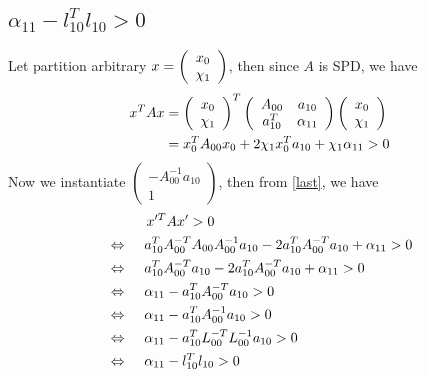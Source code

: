 \documentclass[11pt,a4paper]{article}
\begin{document}
\subsection{$\alpha_{11} - l_{10}^T l_{10} > 0$}
Let partition arbitrary $x = \left( \begin{array}{c} x_{0} \\ \chi_{1} \end{array} \right)$, then since $A$ is SPD, we have
\begin{align}
    x^T A x  \nonumber 
    &= \left( \begin{array}{c} x_{0} \\ \chi_{1} \end{array} \right)^T \left( \begin{array}{cc} A_{00} & a_{10} \\ a_{10}^T & \alpha_{11} \end{array} \right) \left( \begin{array}{c} x_{0} \\ \chi_{1} \end{array} \right) \nonumber \\
    &= x_{0}^T A_{00} x_{0} + 2 \chi_{1} x_{0}^T a_{10} + \chi_{1} \label{last}
    \alpha_{11} > 0
\end{align}
Now we instantiate $\left( \begin{array}{c}
             -A_{00}^{-1} a_{10}  \\ 1 
        \end{array} \right) $, then from \eqref{last}, we have
\begin{equation}
\begin{aligned}
    & \hspace{1cm} x'^T A x' > 0 \\
    &\Leftrightarrow\hspace{0.4cm} a_{10}^T A_{00}^{-T} A_{00} A_{00}^{-1} a_{10} - 2 a_{10}^T A_{00}^{-T}
    a_{10} + \alpha_{11} > 0 \\
    &\Leftrightarrow\hspace{0.4cm} a_{10}^T A_{00}^{-T} a_{10} - 2 a_{10}^T
    A_{00}^{-T} a_{10} + \alpha_{11} > 0\\
    &\Leftrightarrow\hspace{0.4cm} \alpha_{11} - a_{10}^T A_{00}^{-T} a_{10}
    > 0 \\
    &\Leftrightarrow\hspace{0.4cm} \alpha_{11} - a_{10}^T A_{00}^{-1} a_{10} >
    0\\
    &\Leftrightarrow\hspace{0.4cm} \alpha_{11} - a_{10}^T L_{00}^{-T}
    L_{00}^{-1} a_{10} > 0\\
    &\Leftrightarrow\hspace{0.4cm} \alpha_{11} - l_{10}^T l_{10} > 0
\end{aligned}
\end{equation}
\end{document}

